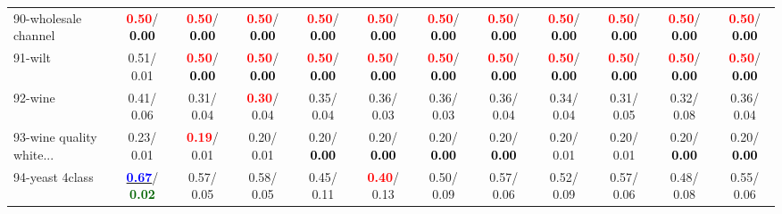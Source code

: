 \begin{table}[h]
\begin{center}
{\begin{tabular}{lc|c|c|c|c|c|c|c|c|c|c}
90-wholesale channel & \textcolor{red}{\textbf{  0.50}}/\textcolor{black}{\textbf{  0.00}} & \textcolor{red}{\textbf{  0.50}}/\textcolor{black}{\textbf{  0.00}} & \textcolor{red}{\textbf{  0.50}}/\textcolor{black}{\textbf{  0.00}} & \textcolor{red}{\textbf{  0.50}}/\textcolor{black}{\textbf{  0.00}} & \textcolor{red}{\textbf{  0.50}}/\textcolor{black}{\textbf{  0.00}} & \textcolor{red}{\textbf{  0.50}}/\textcolor{black}{\textbf{  0.00}} & \textcolor{red}{\textbf{  0.50}}/\textcolor{black}{\textbf{  0.00}} & \textcolor{red}{\textbf{  0.50}}/\textcolor{black}{\textbf{  0.00}} & \textcolor{red}{\textbf{  0.50}}/\textcolor{black}{\textbf{  0.00}} & \textcolor{red}{\textbf{  0.50}}/\textcolor{black}{\textbf{  0.00}} & \textcolor{red}{\textbf{  0.50}}/\textcolor{black}{\textbf{  0.00}} \\
91-wilt &   0.51/  0.01 & \textcolor{red}{\textbf{  0.50}}/\textcolor{black}{\textbf{  0.00}} & \textcolor{red}{\textbf{  0.50}}/\textcolor{black}{\textbf{  0.00}} & \textcolor{red}{\textbf{  0.50}}/\textcolor{black}{\textbf{  0.00}} & \textcolor{red}{\textbf{  0.50}}/\textcolor{black}{\textbf{  0.00}} & \textcolor{red}{\textbf{  0.50}}/\textcolor{black}{\textbf{  0.00}} & \textcolor{red}{\textbf{  0.50}}/\textcolor{black}{\textbf{  0.00}} & \textcolor{red}{\textbf{  0.50}}/\textcolor{black}{\textbf{  0.00}} & \textcolor{red}{\textbf{  0.50}}/\textcolor{black}{\textbf{  0.00}} & \textcolor{red}{\textbf{  0.50}}/\textcolor{black}{\textbf{  0.00}} & \textcolor{red}{\textbf{  0.50}}/\textcolor{black}{\textbf{  0.00}} \\
92-wine &   0.41/  0.06 &   0.31/  0.04 & \textcolor{red}{\textbf{  0.30}}/  0.04 &   0.35/  0.04 &   0.36/  0.03 &   0.36/  0.03 &   0.36/  0.04 &   0.34/  0.04 &   0.31/  0.05 &   0.32/  0.08 &   0.36/  0.04 \\ \hline
93-wine quality white... &   0.23/  0.01 & \textcolor{red}{\textbf{  0.19}}/  0.01 &   0.20/  0.01 &   0.20/\textcolor{black}{\textbf{  0.00}} &   0.20/\textcolor{black}{\textbf{  0.00}} &   0.20/\textcolor{black}{\textbf{  0.00}} &   0.20/\textcolor{black}{\textbf{  0.00}} &   0.20/  0.01 &   0.20/  0.01 &   0.20/\textcolor{black}{\textbf{  0.00}} &   0.20/\textcolor{black}{\textbf{  0.00}} \\
94-yeast 4class & \underline{\textcolor{blue}{\textbf{  0.67}}}/\textcolor{darkgreen}{\textbf{  0.02}} &   0.57/  0.05 &   0.58/  0.05 &   0.45/  0.11 & \textcolor{red}{\textbf{  0.40}}/  0.13 &   0.50/  0.09 &   0.57/  0.06 &   0.52/  0.09 &   0.57/  0.06 &   0.48/  0.08 &   0.55/  0.06 \\\end{tabular}}\label{stratsBalAcc2aSVM}
\end{center}
\end{table}
